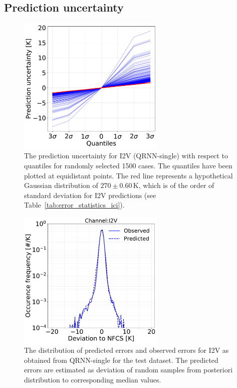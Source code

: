\documentclass[amt, manuscript]{copernicus}
\begin{document}
\subsection{Prediction uncertainty}
\label{sec:prediction_uncertainty}
\begin{figure}[t]
	\includegraphics[width = 70mm]{Figures/prediction_uncertainty_I2V.pdf}	
	\caption{The prediction uncertainty for I2V (QRNN-single) with respect to quantiles for randomly selected 1500 cases. The quantiles have been plotted at equidistant points. The red line represents a hypothetical Gaussian distribution of $270\pm0.60$\,K, which is of the order of standard deviation for I2V predictions (see Table~\ref{tab:error_statistics_ici}).}
	\label{fig:prediction_uncertainty_I2V}	
\end{figure}
\begin{figure}[t]
	\includegraphics[width=70mm]{Figures/deviation_posterior_samples_I2V.pdf}	
	\caption{The distribution of predicted errors and observed errors for I2V as obtained from QRNN-single for the test dataset. The predicted errors are estimated as deviation of random samples from posteriori distribution to corresponding median values.}
	\label{fig:predicted_errors}	
\end{figure}
\end{document}
